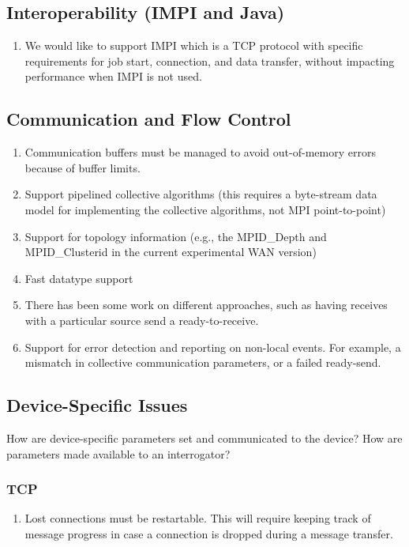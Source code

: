 \documentclass{article}
\begin{document}
\subsection{Interoperability (IMPI and Java)}
\begin{enumerate}
\item We would like to support IMPI which is a TCP protocol with specific
  requirements for job start, connection, and data transfer, without impacting
  performance when IMPI is not used.
\end{enumerate}

\subsection{Communication and Flow Control}
\begin{enumerate}
\item Communication buffers must be managed to avoid out-of-memory errors
  because of buffer limits.
\item Support pipelined collective algorithms (this requires a byte-stream
  data model for implementing the collective algorithms, not MPI
  point-to-point) 
\item Support for topology information (e.g., the MPID\_Depth and
  MPID\_Clusterid in the current experimental WAN version)
\item Fast datatype support
\item There has been some work on different approaches, such as having
  receives with a particular source send a ready-to-receive.
\item Support for error detection and reporting on non-local events.  For
  example, a mismatch in collective communication parameters, or a failed
  ready-send. 
\end{enumerate}

\subsection{Device-Specific Issues}
How are device-specific parameters set and communicated to the device?  How
are parameters made available to an interrogator?

\subsubsection{TCP}
\begin{enumerate}
\item Lost connections must be restartable.  This will require keeping track
  of message progress in case a connection is dropped during a message
  transfer. 
\end{enumerate}
\end{document}
